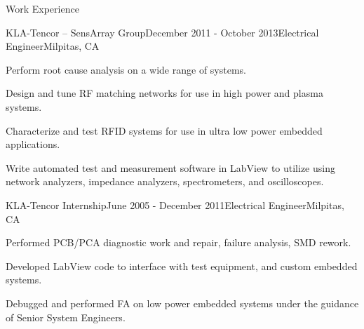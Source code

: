 \documentclass{resume} %
\begin{document}
\begin{rSection}{Work Experience}
\begin{rSubsection}{KLA-Tencor -- SensArray Group}{December 2011 - October 2013}{Electrical Engineer}{Milpitas, CA}
\item Perform root cause analysis on a wide range of systems.
\item Design and tune RF matching networks for use in high power and plasma systems.
\item Characterize and test RFID systems for use in ultra low power embedded applications.
\item Write automated test and measurement software in LabView to utilize using network analyzers, impedance analyzers, spectrometers, and oscilloscopes.

\end{rSubsection}


\begin{rSubsection}{KLA-Tencor Internship}{June 2005 - December 2011}{Electrical Engineer}{Milpitas, CA}
\item Performed PCB/PCA diagnostic work and repair, failure analysis, SMD rework.
\item Developed LabView code to interface with test equipment, and custom embedded systems.
\item Debugged and performed FA on low power embedded systems under the guidance of Senior System Engineers. 
\end{rSubsection}

\end{rSection}

\end{document}
